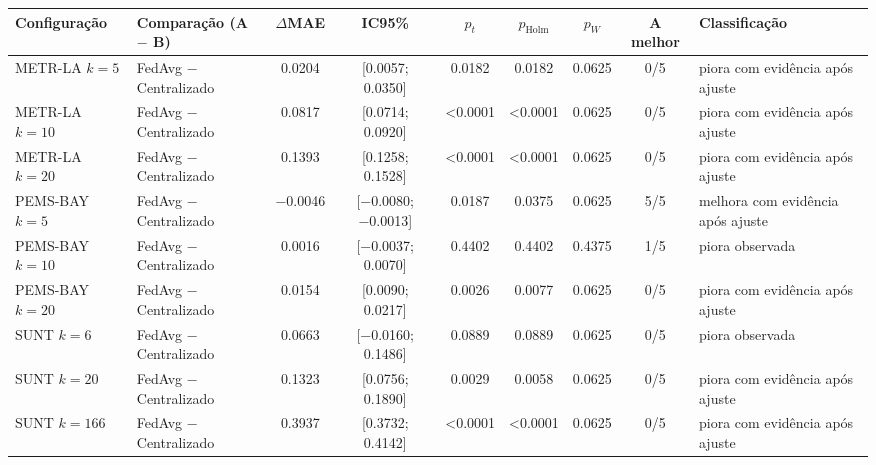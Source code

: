
\begin{tabular}{>{\raggedright\arraybackslash}l>{\raggedright\arraybackslash}p{3.3cm}cccccc>{\raggedright\arraybackslash}p{3.3cm}}
\toprule
Configuração & Comparação (A $-$ B) & $\Delta$MAE & IC95\% & $p_t$ & $p_{\mathrm{Holm}}$ & $p_W$ & A melhor & Classificação \\
\midrule
METR-LA $k=5$ & FedAvg − Centralizado & \num{+0.0204} & [\num{+0.0057}; \num{+0.0350}] & \num{0.0182} & \num{0.0182} & \num{0.0625} & 0/5 & piora com evidência após ajuste \\
METR-LA $k=10$ & FedAvg − Centralizado & \num{+0.0817} & [\num{+0.0714}; \num{+0.0920}] & \num{<0.0001} & \num{<0.0001} & \num{0.0625} & 0/5 & piora com evidência após ajuste \\
METR-LA $k=20$ & FedAvg − Centralizado & \num{+0.1393} & [\num{+0.1258}; \num{+0.1528}] & \num{<0.0001} & \num{<0.0001} & \num{0.0625} & 0/5 & piora com evidência após ajuste \\
PEMS-BAY $k=5$ & FedAvg − Centralizado & \num{-0.0046} & [\num{-0.0080}; \num{-0.0013}] & \num{0.0187} & \num{0.0375} & \num{0.0625} & 5/5 & melhora com evidência após ajuste \\
PEMS-BAY $k=10$ & FedAvg − Centralizado & \num{+0.0016} & [\num{-0.0037}; \num{+0.0070}] & \num{0.4402} & \num{0.4402} & \num{0.4375} & 1/5 & piora observada \\
PEMS-BAY $k=20$ & FedAvg − Centralizado & \num{+0.0154} & [\num{+0.0090}; \num{+0.0217}] & \num{0.0026} & \num{0.0077} & \num{0.0625} & 0/5 & piora com evidência após ajuste \\
SUNT $k=6$ & FedAvg − Centralizado & \num{+0.0663} & [\num{-0.0160}; \num{+0.1486}] & \num{0.0889} & \num{0.0889} & \num{0.0625} & 0/5 & piora observada \\
SUNT $k=20$ & FedAvg − Centralizado & \num{+0.1323} & [\num{+0.0756}; \num{+0.1890}] & \num{0.0029} & \num{0.0058} & \num{0.0625} & 0/5 & piora com evidência após ajuste \\
SUNT $k=166$ & FedAvg − Centralizado & \num{+0.3937} & [\num{+0.3732}; \num{+0.4142}] & \num{<0.0001} & \num{<0.0001} & \num{0.0625} & 0/5 & piora com evidência após ajuste \\
\bottomrule
\end{tabular}
